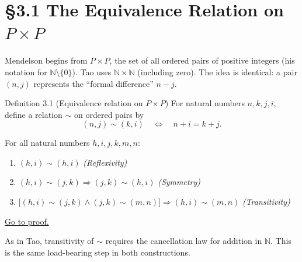 
\section*{\texorpdfstring{\S{}3.1 \quad The Equivalence Relation on $P \times P$}{S3.1 quad The Equivalence Relation on P x P}}

\begin{remark*}
Mendelson begins from $P \times P$, the set of all ordered pairs of
positive integers (his notation for $\mathbb{N} \setminus \{0\}$).
Tao uses $\mathbb{N} \times \mathbb{N}$ (including zero).
The idea is identical: a pair $(n,j)$ represents the
``formal difference'' $n - j$.
\end{remark*}

\begin{corollarybox}{Definition 3.1 (Equivalence relation on $P \times P$)}
For natural numbers $n, k, j, i$, define a relation $\sim$ on
ordered pairs by
\[
(n,j) \sim (k,i)
\quad\Longleftrightarrow\quad
n + i = k + j.
\]
\end{corollarybox}

\begin{theorem}
\label{thm:men-equiv}
For all natural numbers $h,i,j,k,m,n$:
\begin{enumerate}
  \item[\normalfont(R)] $(h,i) \sim (h,i)$ \hfill\textit{(Reflexivity)}
  \item[\normalfont(S)] $(h,i) \sim (j,k) \Rightarrow (j,k) \sim (h,i)$
    \hfill\textit{(Symmetry)}
  \item[\normalfont(T)] $\bigl[(h,i)\sim(j,k)\wedge(j,k)\sim(m,n)\bigr]
    \Rightarrow (h,i)\sim(m,n)$ \hfill\textit{(Transitivity)}
\end{enumerate}
\hyperref[prf:men-equiv]{Go to proof.}
\end{theorem}

\begin{remark*}
As in Tao, transitivity of $\sim$ requires the cancellation law for
addition in $\mathbb{N}$.
This is the same load-bearing step in both constructions.
\end{remark*}

